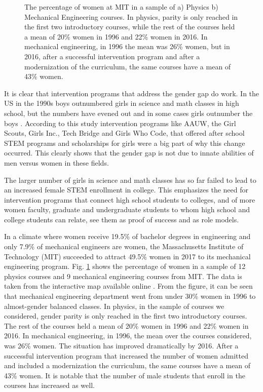 \documentclass[utf8]{frontiersSCNS} %
\begin{document}
\begin{figure}
  \caption{The percentage of women at MIT in a sample of a) Physics b) Mechanical Engineering courses. In physics, parity is only reached in the first two introductory courses, while the rest of the courses held a mean of 20\% women in 1996 and 22\% women in 2016. In mechanical engineering, in 1996 the mean was 26\% women, but in 2016, after a successful intervention program and after a modernization of the curriculum, the same courses have a mean of 43\% women.}
\label{fig:MITWomen}
\end{figure}
It is clear that intervention programs that address the gender gap do work. In the US in the 1990s boys outnumbered girls in science and math classes in high school, but the numbers have evened out and in some cases girls outnumber the boys \citep{highschoolNumbers}. %
According to this study intervention programs like AAUW, the Girl Scouts, Girls Inc., Tech Bridge and Girls Who Code,  that offered after school STEM programs and scholarships for girls were a big part of why this change occurred.  This clearly shows that the gender gap is not due to innate abilities of men versus women in these fields.

The larger number of girls in science and math classes has so far failed to lead to an increased female STEM enrollment in college. This emphasizes the need for intervention programs that connect high school students to colleges, and of more women faculty, graduate and undergraduate students to whom high school and college students can relate, see them as proof of success and as role models. 

In a climate where women receive 19.5\% of bachelor degrees in engineering  and only 7.9\% of mechanical engineers are women, the Massachusetts Institute of Technology (MIT) succeeded to attract 49.5\% women in 2017 to its mechanical engineering program. Fig. \ref{fig:MITWomen} shows the percentage of women in a sample of 12 physics courses and 9 mechanical engineering courses from MIT. The data is taken from the interactive map available online \cite{GenderDiversityMIT}. From the figure, it can be seen that mechanical engineering department went from under 30\% women in 1996 to almost-gender balanced classes.  In physics, in the sample of courses we considered, gender parity is only reached in the first two introductory courses. The rest of the courses held a mean of 20\% women in 1996 and 22\% women in 2016. In mechanical engineering, in 1996, the mean over the courses considered, was 26\% women. The situation has improved dramatically by 2016. After a successful intervention program that increased the number of women admitted and included a modernization the curriculum, the same courses have a mean of 43\% women. It is notable that the number of male students that enroll in the courses has increased as well. %
\end{document}
